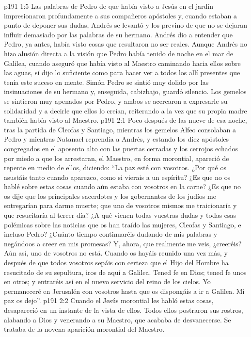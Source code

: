 \vs p191 1:5 Las palabras de Pedro de que había visto a Jesús en el jardín impresionaron profundamente a sus compañeros apóstoles y, cuando estaban a punto de deponer sus dudas, Andrés se levantó y los previno de que no se dejaran influir demasiado por las palabras de su hermano. Andrés dio a entender que Pedro, ya antes, había visto cosas que resultaron no ser reales. Aunque Andrés no hizo alusión directa a la visión que Pedro había tenido de noche en el mar de Galilea, cuando aseguró que había visto al Maestro caminando hacia ellos sobre las aguas, sí dijo lo suficiente como para hacer ver a todos los allí presentes que tenía este suceso en mente. Simón Pedro se sintió muy dolido por las insinuaciones de su hermano y, enseguida, cabizbajo, guardó silencio. Los gemelos se sintieron muy apenados por Pedro, y ambos se acercaron a expresarle su solidaridad y a decirle que ellos lo creían, reiterando a la vez que su propia madre también había visto al Maestro.
\vs p191 2:1 Poco después de las nueve de esa noche, tras la partida de Cleofas y Santiago, mientras los gemelos Alfeo consolaban a Pedro y mientras Natanael reprendía a Andrés, y estando los diez apóstoles congregados en el aposento alto con las puertas cerradas y los cerrojos echados por miedo a que los arrestaran, el Maestro, en forma morontial, apareció de repente en medio de ellos, diciendo: “La paz esté con vosotros. ¿Por qué os asustáis tanto cuando aparezco, como si vierais a un espíritu? ¿Es que no os hablé sobre estas cosas cuando aún estaba con vosotros en la carne? ¿Es que no os dije que los principales sacerdotes y los gobernantes de los judíos me entregarían para darme muerte; que uno de vosotros mismos me traicionaría y que resucitaría al tercer día? ¿A qué vienen todas vuestras dudas y todas esas polémicas sobre las noticias que os han traído las mujeres, Cleofas y Santiago, e incluso Pedro? ¿Cuánto tiempo continuaréis dudando de mis palabras y negándoos a creer en mis promesas? Y, ahora, que realmente me veis, ¿creeréis? Aún así, uno de vosotros no está. Cuando os hayáis reunido una vez más, y después de que todos vosotros sepáis con certeza que el Hijo del Hombre ha resucitado de su sepultura, iros de aquí a Galilea. Tened fe en Dios; tened fe unos en otros; y entraréis así en el nuevo servicio del reino de los cielos. Yo permaneceré en Jerusalén con vosotros hasta que os dispongáis a ir a Galilea. Mi paz os dejo”.
\vs p191 2:2 Cuando el Jesús morontial les habló estas cosas, desapareció en un instante de la vista de ellos. Todos ellos postraron sus rostros, alabando a Dios y venerando a su Maestro, que acababa de desvanecerse. Se trataba de la novena aparición morontial del Maestro.
